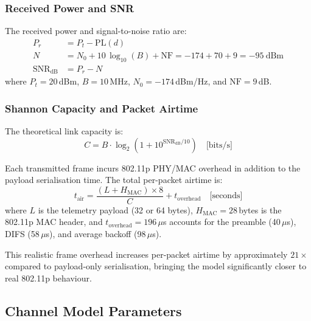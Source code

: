\documentclass[12pt, a4paper]{article}
\begin{document}
\subsubsection{Received Power and SNR}

The received power and signal-to-noise ratio are:
\begin{align}
    P_r &= P_t - \mathrm{PL}(d) \label{eq:rx_power} \\[4pt]
    N   &= N_0 + 10\,\log_{10}(B) + \mathrm{NF}
        = -174 + 70 + 9 = -95~\text{dBm} \label{eq:noise} \\[4pt]
    \mathrm{SNR}_{\text{dB}} &= P_r - N \label{eq:snr}
\end{align}
where $P_t = 20$\,dBm, $B = 10$\,MHz, $N_0 = -174$\,dBm/Hz, and
$\mathrm{NF} = 9$\,dB.

\subsubsection{Shannon Capacity and Packet Airtime}

The theoretical link capacity is:
\begin{equation}
    C = B \cdot \log_2\!\left(1 + 10^{\mathrm{SNR}_{\text{dB}}/10}\right)
       \quad\text{[bits/s]} \label{eq:shannon}
\end{equation}

Each transmitted frame incurs 802.11p PHY/MAC overhead in addition to the
payload serialisation time.  The total per-packet airtime is:
\begin{equation}
    t_{\text{air}} = \frac{(L + H_{\text{MAC}}) \times 8}{C} + t_{\text{overhead}}
       \quad\text{[seconds]}
       \label{eq:airtime}
\end{equation}
where $L$ is the telemetry payload (32 or 64 bytes), $H_{\text{MAC}} = 28$\,bytes
is the 802.11p MAC header, and $t_{\text{overhead}} = 196$\,$\mu$s accounts for
the preamble (40\,$\mu$s), DIFS (58\,$\mu$s), and average backoff (98\,$\mu$s).

This realistic frame overhead increases per-packet airtime by approximately
$21\times$ compared to payload-only serialisation, bringing the model
significantly closer to real 802.11p behaviour.

\subsection{Channel Model Parameters}
\end{document}
